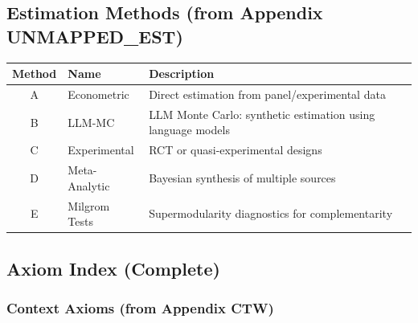 \subsection{Estimation Methods (from Appendix UNMAPPED_EST)}
\label{sec:glossary-methods}

\begin{center}
\renewcommand{\arraystretch}{1.3}
\begin{tabular}{@{}clp{7cm}@{}}
\toprule
\textbf{Method} & \textbf{Name} & \textbf{Description} \\
\midrule
A & Econometric & Direct estimation from panel/experimental data \\
B & LLM-MC & LLM Monte Carlo: synthetic estimation using language models \\
C & Experimental & RCT or quasi-experimental designs \\
D & Meta-Analytic & Bayesian synthesis of multiple sources \\
E & Milgrom Tests & Supermodularity diagnostics for complementarity \\
\bottomrule
\end{tabular}
\end{center}

\subsection{Axiom Index (Complete)}
\label{sec:glossary-axioms}

\subsubsection{Context Axioms (from Appendix CTW)}

